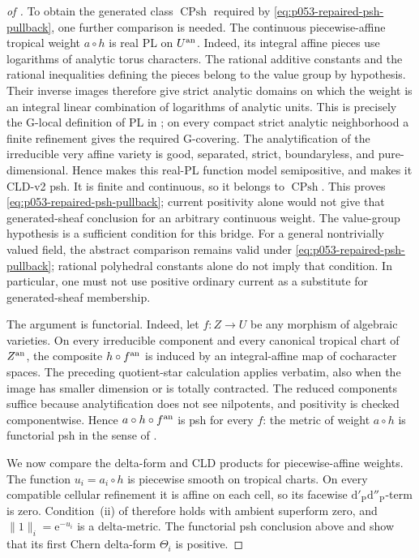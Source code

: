 \begin{proof}[of
]
To obtain the generated class \(\operatorname{CPsh}\) required by
\eqref{eq:p053-repaired-psh-pullback}, one further comparison is needed.
The continuous piecewise-affine tropical weight \(a\circ h\) is real PL
on \(U^{\mathrm{an}}\).  Indeed, its integral affine pieces use logarithms of
analytic torus characters.  The rational additive constants and the
rational inequalities defining the pieces belong to the value group by
hypothesis.  Their inverse images therefore give strict analytic domains
on which the weight is an integral linear combination of logarithms of
analytic units.  This is precisely the G-local definition of PL in
\cite[\S2.5]{GR25PL}; on every compact strict analytic neighborhood a
finite refinement gives the required G-covering.  The analytification of the irreducible very affine
variety is good, separated, strict, boundaryless, and pure-dimensional.
Hence  makes this
real-PL function model semipositive, and
 makes it CLD-v2 psh.
It is finite and continuous, so it belongs to
\(\operatorname{CPsh}\).  This proves
\eqref{eq:p053-repaired-psh-pullback}; current positivity alone would not
give that generated-sheaf conclusion for an arbitrary continuous weight.
The value-group hypothesis is a sufficient condition for this bridge.
For a general nontrivially valued field, the abstract comparison remains
valid under \eqref{eq:p053-repaired-psh-pullback}; rational polyhedral
constants alone do not imply that condition.  In particular, one must
not use positive ordinary current as a substitute for generated-sheaf
membership.

The argument is functorial.  Indeed, let \(f:Z\to U\) be any morphism of
algebraic varieties.  On every irreducible component and every canonical
tropical chart of \(Z^{\mathrm{an}}\), the composite \(h\circ f^{\mathrm{an}}\) is induced
by an integral-affine map of cocharacter spaces.  The preceding quotient-star
calculation applies verbatim, also when the image has smaller dimension or is
totally contracted.  The reduced components suffice because analytification
does not see nilpotents, and positivity is checked componentwise.  Hence
\(a\circ h\circ f^{\mathrm{an}}\) is psh for every \(f\): the metric of weight
\(a\circ h\) is functorial psh in the sense of \cite[\S3.4]{GK19}.

We now compare the delta-form and CLD products for piecewise-affine weights.
The function \(u_i=a_i\circ h\) is piecewise smooth on tropical charts.  On
every compatible cellular refinement it is affine on each cell, so its
facewise \(\mathrm d'_{\mathrm P}\mathrm d''_{\mathrm P}\)-term is zero.
Condition~(ii) of \cite[Definition~9.9]{GK17} therefore holds with ambient
superform zero, and \(\lVert1\rVert_i=\mathrm e^{-u_i}\) is a delta-metric.
The functorial psh conclusion above and \cite[Proposition~8.8]{GK19} show
that its first Chern delta-form \(\Theta_i\) is positive.


\end{proof}
